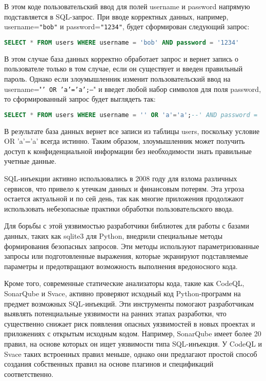 \documentclass[a4paper,12pt]{article} %
\begin{document}
			\par В этом коде пользовательский ввод для полей username и password напрямую подставляется в SQL-запрос. При вводе корректных данных, например, username=\texttt{"bob"} и password=\texttt{"1234"}, будет сформирован следующий запрос:

			\begin{lstlisting}[language=SQL]
SELECT * FROM users WHERE username = 'bob' AND password = '1234'
			\end{lstlisting}

			В этом случае база данных корректно обработает запрос и вернет запись о пользователе только в том случае, если он существует и введен правильный пароль. Однако если злоумышленник изменит пользовательский ввод на username="\texttt{' OR 'a'='a';--}" и введет любой набор символов для поля password, то сформированный запрос будет выглядеть так:

			\begin{lstlisting}[language=SQL]
SELECT * FROM users WHERE username = '' OR 'a'='a';--' AND password = ' '
			\end{lstlisting}

			В результате база данных вернет все записи из таблицы users, поскольку условие OR 'a'='a' всегда истинно. Таким образом, злоумышленник может получить доступ к конфиденциальной информации без необходимости знать правильные учетные данные.

			\par SQL-инъекции активно использовались в 2008 году для взлома различных сервисов, что привело к утечкам данных и финансовым потерям. Эта угроза остается актуальной и по сей день, так как многие приложения продолжают использовать небезопасные практики обработки пользовательского ввода.

			\par Для борьбы с этой уязвимостью разработчики библиотек для работы с базами данных, таких как sqlite3 для Python, внедрили специальные методы формирования безопасных запросов. Эти методы используют параметризованные запросы или подготовленные выражения, которые экранируют подставляемые параметры и предотвращают возможность выполнения вредоносного кода.

			\par Кроме того, современные статические анализаторы кода, такие как CodeQL, SonarQube и Svace, активно проверяют исходный код Python-программ на предмет возможных SQL-инъекций. Эти инструменты помогают разработчикам выявлять потенциальные уязвимости на ранних этапах разработки, что существенно снижает риск появления опасных уязвимостей в новых проектах и приложениях с открытым исходным кодом. Например, SonarQube имеет более 20 правил, на основе которых он ищет уязвимости типа SQL-инъекция. У CodeQL и Svace таких встроенных правил меньше, однако они предлагают простой способ создания собственных правил на основе плагинов и спецификаций соответственно.
\end{document}
